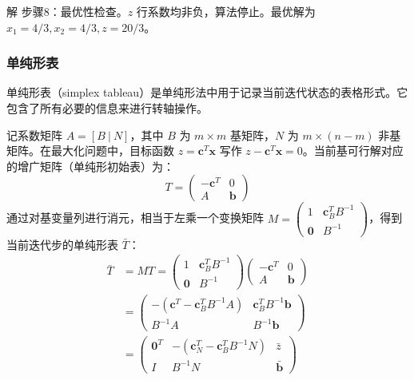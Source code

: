 \documentclass[12pt]{article}
\theoremstyle{plain}
\theoremstyle{definition}
\newenvironment{slv}[1][解]{\begin{paragraph}{#1}\mbox{}}{\end{paragraph}\par\nopagebreak}
\begin{document}
\begin{slv}
步骤8：最优性检查。$z$ 行系数均非负，算法停止。最优解为 $x_1=4/3, x_2=4/3, z=20/3$。
\end{slv}

\subsubsection{单纯形表}\label{subsubsec:simplex_tableau}

单纯形表（simplex tableau）是单纯形法中用于记录当前迭代状态的表格形式。它包含了所有必要的信息来进行转轴操作。

记系数矩阵 $A = [B \ | \ N]$，其中 $B$ 为 $m \times m$ 基矩阵，$N$ 为 $m \times (n-m)$ 非基矩阵。在最大化问题中，目标函数 $z = \bm{c}^T \bm{x}$ 写作 $z - \bm{c}^T \bm{x} = 0$。当前基可行解对应的增广矩阵（单纯形初始表）为：
\begin{equation}
    T = \begin{pmatrix}
        -\bm{c}^T & 0 \\
        A & \bm{b}
    \end{pmatrix}
\end{equation}
通过对基变量列进行消元，相当于左乘一个变换矩阵 $M = \begin{pmatrix} 1 & \bm{c}_B^T B^{-1} \\ \bm{0} & B^{-1} \end{pmatrix}$，得到当前迭代步的单纯形表 $\bar{T}$：
\begin{align*}
    \bar{T} &= M T = \begin{pmatrix}
        1 & \bm{c}_B^T B^{-1} \\
        \bm{0} & B^{-1}
    \end{pmatrix} \begin{pmatrix}
        -\bm{c}^T & 0 \\
        A & \bm{b}
    \end{pmatrix} \\
    &= \begin{pmatrix}        
        -(\bm{c}^T - \bm{c}_B^T B^{-1} A) & \bm{c}_B^T B^{-1} \bm{b} \\
        B^{-1} A & B^{-1} \bm{b}
    \end{pmatrix} \\
    &= \begin{pmatrix}        
        \bm{0}^T & -(\bm{c}_N^T - \bm{c}_B^T B^{-1} N) & \bar{z} \\
        I & B^{-1} N & \bar{\bm{b}}
    \end{pmatrix}
\end{align*}
\end{document}
